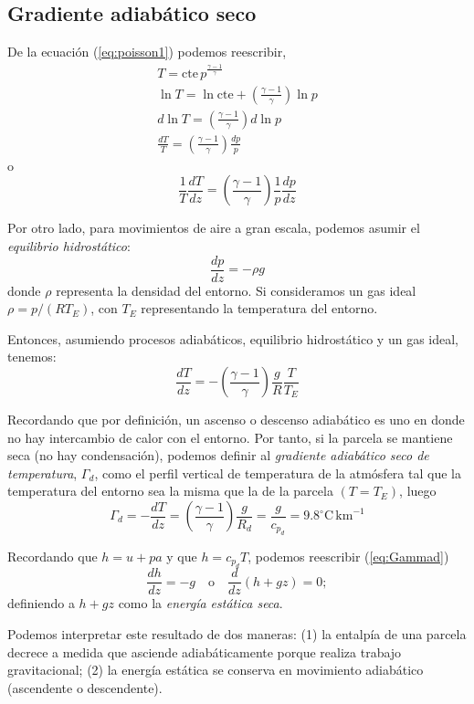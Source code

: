\documentclass[openany]{book}
\begin{document}
\subsection{Gradiente adiabático seco}
De la ecuación (\ref{eq:poisson1}) podemos reescribir,
\begin{gather*}
	T=\mathrm{cte}\,p^{\frac{\gamma-1}{\gamma}}\\
	\ln{T}=\ln{\mathrm{cte}}+\left({\frac{\gamma-1}{\gamma}}\right)\ln{p}\\
	d\ln{T}=\left({\frac{\gamma-1}{\gamma}}\right)d\ln{p}\\
	\frac{dT}{T}=\left({\frac{\gamma-1}{\gamma}}\right)\frac{dp}{p}
\end{gather*}
o
\begin{equation}\label{eq:dpdz-dtdz}
	\frac{1}{T}\frac{dT}{dz}=\left({\frac{\gamma-1}{\gamma}}\right)\frac{1}{p}\frac{dp}{dz}
\end{equation}
\par Por otro lado, para movimientos de aire a gran escala, podemos asumir el \emph{equilibrio hidrostático}:
\begin{equation}
	\label{eq:eq-hidro}
	\frac{dp}{dz}=-\rho g
\end{equation}
donde $\rho$ representa la densidad del entorno. Si consideramos un gas ideal $\rho=p/(RT_E)$, con $T_E$ representando la temperatura del entorno.
\par Entonces, asumiendo procesos adiabáticos, equilibrio hidrostático y un gas ideal, tenemos:
\begin{equation}
	\frac{dT}{dz}=-\left({\frac{\gamma-1}{\gamma}}\right)\frac{g}{R}\frac{T}{T_E}
\end{equation}
\par Recordando que por definición, un ascenso o descenso adiabático es uno en donde no hay intercambio de calor con el entorno. Por tanto, si la parcela se mantiene seca (no hay condensación), podemos definir al \emph{gradiente adiabático seco de temperatura}, $\Gamma_d$, como el perfil vertical de temperatura de la atmósfera tal que la temperatura del entorno sea la misma que la de la parcela $(T=T_E)$, luego
\begin{equation}\label{eq:Gammad}
	\Gamma_d=-\frac{dT}{dz}=\left({\frac{\gamma-1}{\gamma}}\right)\frac{g}{R_d}=\frac{g}{c_{p_d}}=9.8^\circ\mathrm{C\,km}^{-1}
\end{equation}
\par Recordando que $h=u+pa$ y que $h=c_{p_d}T$, podemos reescribir (\ref{eq:Gammad})
\begin{equation}
	\frac{dh}{dz}=-g\quad\mathrm{o}\quad\frac{d}{dz}(h+gz)=0;
\end{equation}
definiendo a $h+gz$ como la \emph{energía estática seca}.
\par Podemos interpretar este resultado de dos maneras: (1) la entalpía de una parcela decrece a medida que asciende adiabáticamente porque realiza trabajo gravitacional; (2) la energía estática se conserva en movimiento adiabático (ascendente o descendente).
\end{document}
